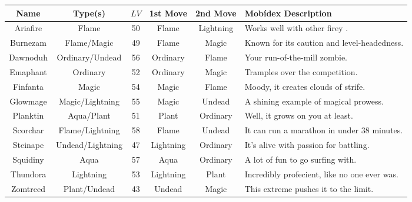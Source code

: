 \begin{center}
\begin{tabular}{|c|c|c|c|c|p{2in}|}\hline
  Name & Type(s) & \(LV\) & 1st Move & 2nd Move & Mob\'idex Description \\\hline\hline
  Ariafire & Flame & 50 & Flame & Lightning &
    Works well with other firey \mappMobimon{}. \\\hline
  Burnezam & Flame/Magic & 49 & Flame & Magic &
    Known for its caution and level-headedness. \\\hline
  Dawnoduh & Ordinary/Undead & 56 & Ordinary & Flame &
    Your run-of-the-mill zombie. \\\hline
  Emaphant & Ordinary & 52 & Ordinary & Magic &
    Tramples over the competition. \\\hline
  Finfanta & Magic & 54 & Magic & Flame &
    Moody, it creates clouds of strife. \\\hline
  Glowmage & Magic/Lightning & 55 & Magic & Undead &
    A shining example of magical prowess. \\\hline
  Planktin & Aqua/Plant & 51 & Plant & Ordinary &
    Well, it grows on you at least. \\\hline
  Scorchar & Flame/Lightning & 58 & Flame & Undead &
    It can run a marathon in under 38 minutes. \\\hline
  Steinape & Undead/Lightning & 47 & Lightning & Ordinary &
    It's alive with passion for battling. \\\hline
  Squidiny & Aqua & 57 & Aqua & Ordinary &
    A lot of fun to go surfing with. \\\hline
  Thundora & Lightning & 53 & Lightning & Plant &
    Incredibly profecient, like no one ever was. \\\hline
  Zomtreed & Plant/Undead & 43 & Undead & Magic &
    This extreme \mappMobimon{} pushes it to the limit. \\\hline
\end{tabular}
\end{center}


